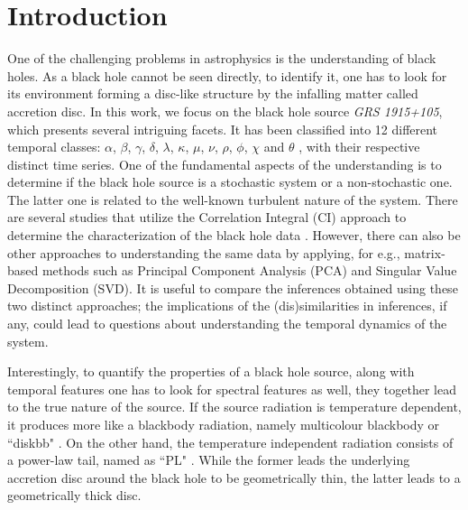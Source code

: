 \documentclass[10pt,conference]{IEEEtran}
\begin{document}
\section{Introduction}
One of the challenging problems in astrophysics is the understanding of black holes. As a black hole cannot be seen directly, to identify it, one has to look for its environment forming a disc-like structure by the infalling matter called accretion disc. In this work, we focus on the black hole source \textit{GRS 1915+105}, which presents several intriguing facets. It has been classified into 12 different temporal classes: $\alpha$, $\beta$, $\gamma$, $\delta$, $\lambda$, $\kappa$, $\mu$, $\nu$, $\rho$, $\phi$, $\chi$ and $\theta$ \cite{Belloni2000}, with their respective distinct time series. One of the fundamental aspects of the understanding is to determine if the black hole source is a stochastic system or a non-stochastic one. The latter one is related to the well-known turbulent nature of the system. There are several studies that utilize the Correlation Integral (CI) approach to determine the characterization of the black hole data \cite{Mukhopadhyay2004, misra2006}. However, there can also be other approaches to understanding the same data by applying, for e.g.,  matrix-based methods such as Principal Component Analysis (PCA) and Singular Value Decomposition (SVD). It is useful to compare the inferences obtained using these two distinct approaches; the implications of the (dis)similarities in inferences, if any, could lead to questions about understanding the temporal dynamics of the system.

Interestingly, to quantify the properties of a black hole source, along with temporal features one has to look for spectral features as well, they together lead to the true nature of the source. If the source radiation is temperature dependent, it produces more like a blackbody radiation, namely multicolour blackbody or ``diskbb" \cite{Shakura1973}. On the other hand, the temperature independent radiation consists of a power-law tail, named as ``PL" \cite{chakrabarti1995,narayan1994}. While the former leads the underlying accretion disc around the black hole to be geometrically thin, the latter leads to a geometrically thick disc.
\end{document}
